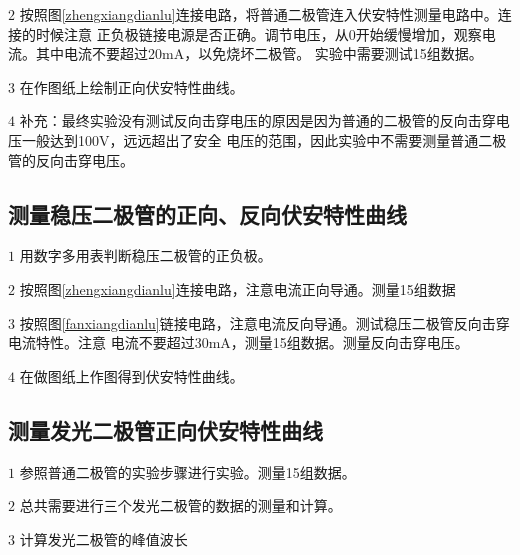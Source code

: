 \documentclass{ctexart}
\begin{document}
  \(2\) 按照图\ref{zhengxiangdianlu}连接电路，将普通二极管连入伏安特性测量电路中。连接的时候注意
        正负极链接电源是否正确。调节电压，从0开始缓慢增加，观察电流。其中电流不要超过20mA，以免烧坏二极管。
        实验中需要测试15组数据。

  \(3\) 在作图纸上绘制正向伏安特性曲线。

  \(4\) 补充：最终实验没有测试反向击穿电压的原因是因为普通的二极管的反向击穿电压一般达到100V，远远超出了安全
        电压的范围，因此实验中不需要测量普通二极管的反向击穿电压。

  \subsection{测量稳压二极管的正向、反向伏安特性曲线}
  \(1\) 用数字多用表判断稳压二极管的正负极。
  
  \(2\) 按照图\ref{zhengxiangdianlu}连接电路，注意电流正向导通。测量15组数据

  \(3\) 按照图\ref{fanxiangdianlu}链接电路，注意电流反向导通。测试稳压二极管反向击穿电流特性。注意
        电流不要超过30mA，测量15组数据。测量反向击穿电压。

  \(4\) 在做图纸上作图得到伏安特性曲线。

  \subsection{测量发光二极管正向伏安特性曲线}
  \(1\) 参照普通二极管的实验步骤进行实验。测量15组数据。

  \(2\) 总共需要进行三个发光二极管的数据的测量和计算。

  \(3\) 计算发光二极管的峰值波长
\newpage
\end{document}
